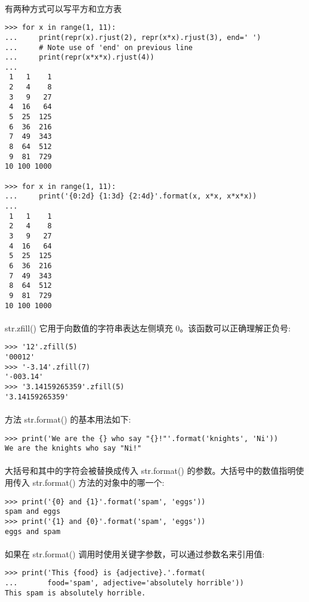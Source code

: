 \documentclass{article}
\begin{document}
\begin{CJK}{UTF8}{gbsn}
\paragraph{}
有两种方式可以写平方和立方表
\begin{verbatim}
>>> for x in range(1, 11):
...     print(repr(x).rjust(2), repr(x*x).rjust(3), end=' ')
...     # Note use of 'end' on previous line
...     print(repr(x*x*x).rjust(4))
...
 1   1    1
 2   4    8
 3   9   27
 4  16   64
 5  25  125
 6  36  216
 7  49  343
 8  64  512
 9  81  729
10 100 1000

>>> for x in range(1, 11):
...     print('{0:2d} {1:3d} {2:4d}'.format(x, x*x, x*x*x))
...
 1   1    1
 2   4    8
 3   9   27
 4  16   64
 5  25  125
 6  36  216
 7  49  343
 8  64  512
 9  81  729
10 100 1000
\end{verbatim}
\paragraph{}
 str.zfill() 它用于向数值的字符串表达左侧填充 0。该函数可以正确理解正负号:
\begin{verbatim}
>>> '12'.zfill(5)
'00012'
>>> '-3.14'.zfill(7)
'-003.14'
>>> '3.14159265359'.zfill(5)
'3.14159265359'
\end{verbatim}
\paragraph{}
方法 str.format() 的基本用法如下:
\begin{verbatim}
>>> print('We are the {} who say "{}!"'.format('knights', 'Ni'))
We are the knights who say "Ni!"
\end{verbatim}
\paragraph{}
大括号和其中的字符会被替换成传入 str.format() 的参数。大括号中的数值指明使用传入 str.format() 方法的对象中的哪一个:
\begin{verbatim}
>>> print('{0} and {1}'.format('spam', 'eggs'))
spam and eggs
>>> print('{1} and {0}'.format('spam', 'eggs'))
eggs and spam
\end{verbatim}
\paragraph{}
如果在 str.format() 调用时使用关键字参数，可以通过参数名来引用值:
\begin{verbatim}
>>> print('This {food} is {adjective}.'.format(
...       food='spam', adjective='absolutely horrible'))
This spam is absolutely horrible.
\end{verbatim}

\end{CJK}
\end{document}
